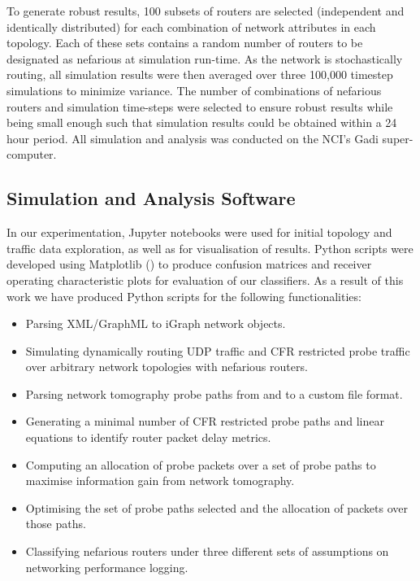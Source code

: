 To generate robust results, 100 subsets of routers are selected (independent
and identically distributed) for each combination of network attributes in each topology. Each of these sets contains a random number of routers to be designated as nefarious at simulation run-time. As the network is stochastically routing, all simulation results were then averaged over three 100,000 timestep simulations to minimize variance. The number of combinations of nefarious routers and simulation time-steps were selected to ensure robust results while being small enough such that simulation results could be obtained within a 24 hour period. All simulation and analysis was conducted on the NCI's Gadi super-computer.\par

\subsection{Simulation and Analysis Software}
\label{ssec:Msoftware}
In our experimentation, Jupyter notebooks were used for initial topology and traffic data exploration, as well as for visualisation of results. Python scripts were developed using Matplotlib (\cite{hunter_matplotlib_2007}) to produce confusion matrices and receiver operating characteristic plots for evaluation of our classifiers. As a result of this work we have produced Python scripts for the following functionalities:
\begin{itemize}
    \item Parsing XML/GraphML to iGraph network objects.
    \item Simulating dynamically routing UDP traffic and CFR restricted probe traffic over arbitrary network topologies with nefarious routers.
    \item Parsing network tomography probe paths from and to a custom file format.
    \item Generating a minimal number of CFR restricted probe paths and linear equations to identify router packet delay metrics.
    \item Computing an allocation of probe packets over a set of probe paths to maximise information gain from network tomography.
    \item Optimising the set of probe paths selected and the allocation of packets over those paths.
    \item Classifying nefarious routers under three different sets of assumptions on networking performance logging.
\end{itemize}

